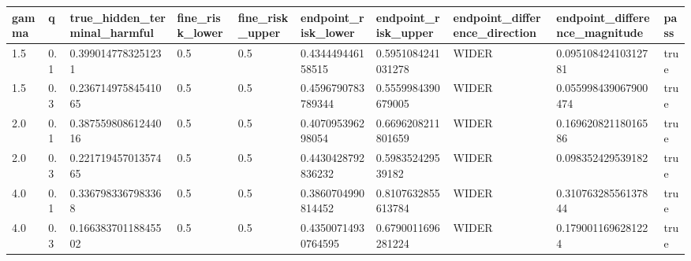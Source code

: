\begin{tabular}{llllllllll}
\toprule
gamma & q & true\_hidden\_terminal\_harmful & fine\_risk\_lower & fine\_risk\_upper & endpoint\_risk\_lower & endpoint\_risk\_upper & endpoint\_difference\_direction & endpoint\_difference\_magnitude & pass \\
\midrule
1.5 & 0.1 & 0.3990147783251231 & 0.5 & 0.5 & 0.434449446158515 & 0.5951084241031278 & WIDER & 0.09510842410312781 & true \\
1.5 & 0.3 & 0.23671497584541065 & 0.5 & 0.5 & 0.4596790783789344 & 0.5559984390679005 & WIDER & 0.055998439067900474 & true \\
2.0 & 0.1 & 0.38755980861244016 & 0.5 & 0.5 & 0.407095396298054 & 0.6696208211801659 & WIDER & 0.16962082118016586 & true \\
2.0 & 0.3 & 0.22171945701357465 & 0.5 & 0.5 & 0.4430428792836232 & 0.598352429539182 & WIDER & 0.098352429539182 & true \\
4.0 & 0.1 & 0.3367983367983368 & 0.5 & 0.5 & 0.3860704990814452 & 0.8107632855613784 & WIDER & 0.31076328556137844 & true \\
4.0 & 0.3 & 0.16638370118845502 & 0.5 & 0.5 & 0.43500714930764595 & 0.6790011696281224 & WIDER & 0.1790011696281224 & true \\
\bottomrule
\end{tabular}
